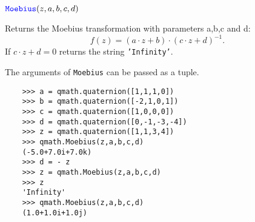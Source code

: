 \documentclass[11pt]{paper}
\begin{document}
\noindent $\textcolor{blue}{\texttt{\mbox{Moebius}}}(z,a,b,c,d)$ 

Returns the Moebius transformation with parameters a,b,c and d:
$$
f(z)=(a\cdot z+b)\cdot(c\cdot z+d)^{-1}. 
$$
If $c \cdot z + d = 0$ returns the string \texttt{\mbox{'Infinity'}}. 

The arguments of {\texttt{\mbox{Moebius}}} can be passed as a tuple.
\begin{verbatim}
    >>> a = qmath.quaternion([1,1,1,0])
    >>> b = qmath.quaternion([-2,1,0,1])
    >>> c = qmath.quaternion([1,0,0,0])
    >>> d = qmath.quaternion([0,-1,-3,-4])
    >>> z = qmath.quaternion([1,1,3,4])
    >>> qmath.Moebius(z,a,b,c,d)
    (-5.0+7.0i+7.0k)
    >>> d = - z
    >>> z = qmath.Moebius(z,a,b,c,d)
    >>> z
    'Infinity'
    >>> qmath.Moebius(z,a,b,c,d)
    (1.0+1.0i+1.0j)
\end{verbatim}

\bigskip
\end{document}
